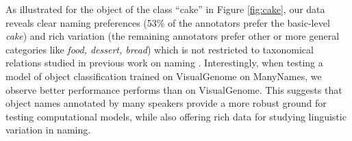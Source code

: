 As illustrated for the object of the class ``cake'' in Figure \ref{fig:cake}, our data reveals clear naming preferences (53\% of the annotators prefer the basic-level \textit{cake}) and rich variation (the remaining annotators prefer other or more general categories like \textit{food, dessert, bread}) which is not restricted to taxonomical relations studied in previous work on naming \cite{rosch1976basic,Ordonez:2016,graf2016animal}. 
Interestingly, when testing a model of object classification trained on VisualGenome on ManyNames, we observe  better performance performs than on VisualGenome.
This suggests that object names annotated by many speakers provide a more robust ground for testing computational models, while also offering rich data for studying linguistic variation in naming.


